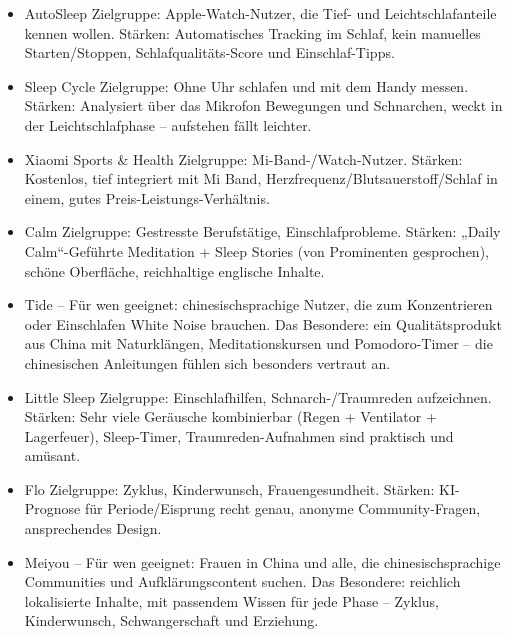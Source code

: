 
\begin{itemize}
  \item AutoSleep Zielgruppe: Apple-Watch-Nutzer, die Tief- und Leichtschlafanteile kennen wollen. Stärken: Automatisches Tracking im Schlaf, kein manuelles Starten/Stoppen, Schlafqualitäts-Score und Einschlaf-Tipps.
  \item Sleep Cycle Zielgruppe: Ohne Uhr schlafen und mit dem Handy messen. Stärken: Analysiert über das Mikrofon Bewegungen und Schnarchen, weckt in der Leichtschlafphase – aufstehen fällt leichter.
  \item Xiaomi Sports \& Health Zielgruppe: Mi-Band-/Watch-Nutzer. Stärken: Kostenlos, tief integriert mit Mi Band, Herzfrequenz/Blutsauerstoff/Schlaf in einem, gutes Preis-Leistungs-Verhältnis.
\end{itemize}


\begin{itemize}
  \item Calm Zielgruppe: Gestresste Berufstätige, Einschlafprobleme. Stärken: „Daily Calm“-Geführte Meditation + Sleep Stories (von Prominenten gesprochen), schöne Oberfläche, reichhaltige englische Inhalte.
  \item Tide – Für wen geeignet: chinesischsprachige Nutzer, die zum Konzentrieren oder Einschlafen White Noise brauchen. Das Besondere: ein Qualitätsprodukt aus China mit Naturklängen, Meditationskursen und Pomodoro-Timer – die chinesischen Anleitungen fühlen sich besonders vertraut an.
  \item Little Sleep Zielgruppe: Einschlafhilfen, Schnarch-/Traumreden aufzeichnen. Stärken: Sehr viele Geräusche kombinierbar (Regen + Ventilator + Lagerfeuer), Sleep-Timer, Traumreden-Aufnahmen sind praktisch und amüsant.
\end{itemize}


\begin{itemize}
  \item Flo Zielgruppe: Zyklus, Kinderwunsch, Frauengesundheit. Stärken: KI-Prognose für Periode/Eisprung recht genau, anonyme Community-Fragen, ansprechendes Design.
  \item Meiyou – Für wen geeignet: Frauen in China und alle, die chinesischsprachige Communities und Aufklärungscontent suchen. Das Besondere: reichlich lokalisierte Inhalte, mit passendem Wissen für jede Phase – Zyklus, Kinderwunsch, Schwangerschaft und Erziehung.
\end{itemize}

